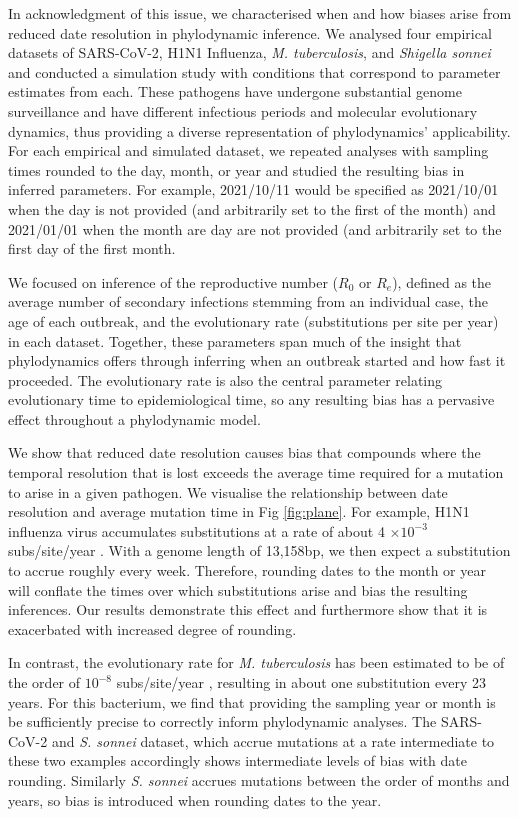 \documentclass{article}
\begin{document}
\begin{spacing}{1.5}
In acknowledgment of this issue, we characterised when and how biases arise from reduced date resolution in phylodynamic inference. We analysed four empirical datasets of SARS-CoV-2, H1N1 Influenza, \textit{M. tuberculosis}, and \textit{Shigella sonnei} and conducted a simulation study with conditions that correspond to parameter estimates from each. These pathogens have undergone substantial genome surveillance and have different infectious periods and molecular evolutionary dynamics, thus providing a diverse representation of phylodynamics' applicability. For each empirical and simulated dataset, we repeated analyses with sampling times rounded to the day, month, or year and studied the resulting bias in inferred parameters. For example, 2021/10/11 would be specified as 2021/10/01 when the day is not provided (and arbitrarily set to the first of the month) and 2021/01/01 when the month are day are not provided (and arbitrarily set to the first day of the first month.

We focused on inference of the reproductive number ($R_0$ or $R_e$), defined as the average number of secondary infections stemming from an individual case, the age of each outbreak, and the evolutionary rate (substitutions per site per year) in each dataset. Together, these parameters span much of the insight that phylodynamics offers through inferring when an outbreak started and how fast it proceeded. The evolutionary rate is also the central parameter relating evolutionary time to epidemiological time, so any resulting bias has a pervasive effect throughout a phylodynamic model.

 We show that reduced date resolution causes bias that compounds where the temporal resolution that is lost exceeds the average time required for a mutation to arise in a given pathogen. We visualise the relationship between date resolution and average mutation time in Fig \ref{fig:plane}. For example, H1N1 influenza virus accumulates substitutions at a rate of about 4 $\times10^{-3}$ subs/site/year \citep{hedge_2013_real-time}. With a genome length of 13,158bp, we then expect a substitution to accrue roughly every week. Therefore, rounding dates to the month or year will conflate the times over which substitutions arise and bias the resulting inferences. Our results demonstrate this effect and furthermore show that it is exacerbated with increased degree of rounding.
 
 In contrast, the evolutionary rate for \textit{M. tuberculosis} has been estimated to be of the order of $10^{-8}$ subs/site/year \citep{menardo2019molecular}, resulting in about one substitution every 23 years. For this bacterium, we find that providing the sampling year or month is be sufficiently precise to correctly inform phylodynamic analyses. The SARS-CoV-2 and \textit{S. sonnei} dataset, which accrue mutations at a rate intermediate to these two examples accordingly shows intermediate levels of bias with date rounding. Similarly \textit{S. sonnei} accrues mutations between the order of months and years, so bias is introduced when rounding dates to the year.


\end{spacing}
\end{document}
